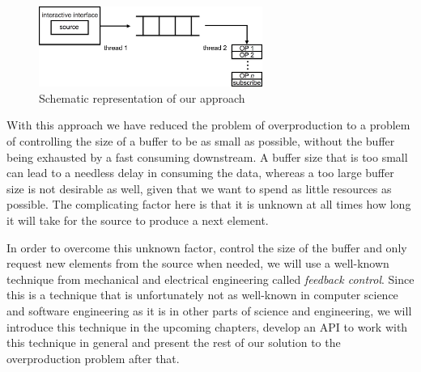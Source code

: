 \begin{figure}[H]
	\begin{center}
		\includegraphics[width=0.65\textwidth]{figures/Approach.png}
	\end{center}
	\label{fig:new-approach}
	\caption{Schematic representation of our approach}
\end{figure}

With this approach we have reduced the problem of overproduction to a problem of controlling the size of a buffer to be as small as possible, without the buffer being exhausted by a fast consuming downstream. A buffer size that is too small can lead to a needless delay in consuming the data, whereas a too large buffer size is not desirable as well, given that we want to spend as little resources as possible. The complicating factor here is that it is unknown at all times how long it will take for the source to produce a next element.

In order to overcome this unknown factor, control the size of the buffer and only request new elements from the source when needed, we will use a well-known technique from mechanical and electrical engineering called \textit{feedback control}. Since this is a technique that is unfortunately not as well-known in computer science and software engineering as it is in other parts of science and engineering, we will introduce this technique in the upcoming chapters, develop an API to work with this technique in general and present the rest of our solution to the overproduction problem after that.
